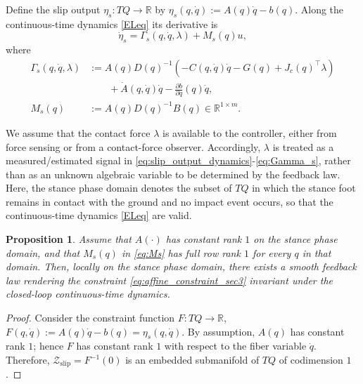 \documentclass[letterpaper, 10 pt, conference]{ieeeconf}
\newtheorem{proposition}{Proposition}
\begin{document}
Define the slip output $\eta_s:TQ\to\mathbb{R}$ by $\eta_s(q,\dot q):=A(q)\dot q-b(q)$. Along the continuous-time dynamics \eqref{ELeq} its derivative is
\begin{equation}
\dot\eta_s
=
\Gamma_s(q,\dot q,\lambda)+M_s(q)u,
\label{eq:slip_output_dynamics}
\end{equation}
where
\begin{align}
\Gamma_s(q,\dot q,\lambda)
&:=
A(q)D(q)^{-1}\!\left(-C(q,\dot q)\dot q-G(q)+J_c(q)^\top\lambda\right)
\nonumber\\
&\qquad
+\dot A(q,\dot q)\dot q-\frac{\partial b}{\partial q}(q)\dot q,
\label{eq:Gamma_s}
\\
M_s(q)&:=A(q)D(q)^{-1}B(q)\in\mathbb R^{1\times m}.
\label{eq:Ms}
\end{align} 
{We assume that the contact force $\lambda$ is available to the
controller, either from force sensing or from a contact-force observer.
Accordingly, $\lambda$ is treated as a measured/estimated signal in
\eqref{eq:slip_output_dynamics}-\eqref{eq:Gamma_s}, rather than as an
unknown algebraic variable to be determined by the feedback law. Here, the stance phase domain denotes the subset of $TQ$ in which the stance foot remains in contact with the ground and no impact event occurs, so that the continuous-time dynamics \eqref{ELeq} are valid.

\begin{proposition}
Assume that $A(\cdot)$ has constant rank $1$ on the stance phase domain, and that $M_s(q)$ in \eqref{eq:Ms} has full row rank $1$ for every $q$ in that domain. Then, locally on the stance phase domain, there exists a smooth feedback law rendering the constraint \eqref{eq:affine_constraint_sec3} invariant under the closed-loop continuous-time dynamics.
\end{proposition}

\begin{proof}
Consider the constraint function $F:TQ\to\mathbb{R}$, $F(q,\dot q):=A(q)\dot q-b(q)=\eta_s(q,\dot q)$. By assumption, $A(q)$ has constant rank $1$; hence $F$ has constant rank $1$ with respect to the fiber variable $\dot q$. Therefore, $\mathcal Z_{\mathrm{slip}}=F^{-1}(0)$ is an embedded submanifold of $TQ$ of codimension $1$.


\end{proof}}
\end{document}
